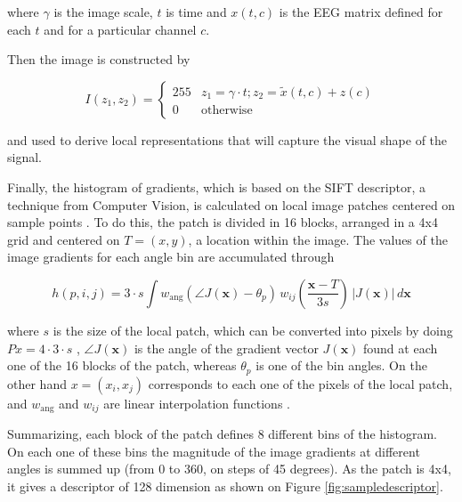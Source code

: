 \documentclass[entropy,article,submit,moreauthors,pdftex,10pt,a4paper]{mdpi}
\begin{document}
\noindent where $\gamma$ is the image scale, $t$ is time and $ x(t,c) $ is the EEG matrix defined for each $t$ and for a particular channel $c$.

Then the image is constructed by

\begin{equation}
I(z_1,z_2) = \left\{ \begin{array}{rl}
255 & z_1 = \gamma \cdot t; z_2 = \tilde{x}(t,c) + z(c) \\
0   & \mbox{otherwise}
\end{array}\right.
\label{eq:images}
\end{equation}

\noindent and used to derive local representations that will capture the visual shape of the signal.

Finally, the histogram of gradients, which is based on the SIFT \citep{Lowe2004} descriptor, a technique from Computer Vision, is calculated on local image patches centered on sample points \citep{Vedaldi2010}.
To do this, the patch is divided in 16 blocks, arranged in a 4x4 grid and centered on $T = (x,y)$, a location within the image. The values of the image gradients for each angle bin are accumulated through

\begin{equation}
 h(p,i,j) = 3 \cdot s \int w_\mathrm{ang}(\angle J(\mathbf{x}) - \theta_p)\, w_{ij}\left(\frac{\mathbf{x} - T}{3 s}\right)\, |J(\mathbf{x})|\, d\mathbf{x}
\label{eq:histogram}
\end{equation}

\noindent where $s$ is the size of the local patch, which can be converted into pixels by doing $ Px = 4 \cdot 3 \cdot s $ , $\angle J(\mathbf{x})$ is the angle of the gradient vector $ J(\mathbf{x}) $  found at each one of the 16 blocks of the patch, whereas  $\theta_p$ is one of the bin angles.  On the other hand $ x = (x_i, x_j) $ corresponds to each one of the pixels of the local patch, and $ w_\mathrm{ang}  $  and $ w_{ij} $ are linear interpolation functions \citep{Lowe2004}.
  
Summarizing, each block of the patch defines 8 different bins of the histogram.  On each one of these bins  the magnitude of the image gradients at different angles is summed up (from 0 to 360, on steps of 45 degrees).  As the patch is 4x4, it gives a descriptor of 128 dimension as shown on Figure \ref{fig:sampledescriptor}.
 
\end{document}
